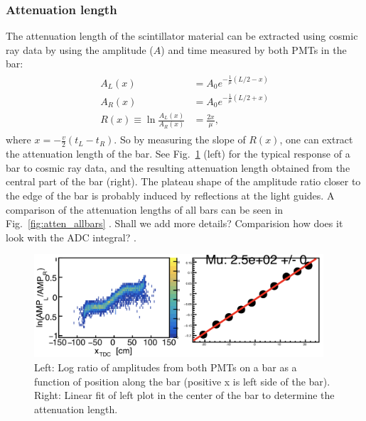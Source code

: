 \documentclass[3p,final,twocolumn]{elsarticle}
\begin{document}
{%
\subsubsection{Attenuation length}
The attenuation length of the scintillator material can be extracted using cosmic ray data by using the 
amplitude ($A$) and time measured by both PMTs in the bar:
\begin{eqnarray}
	\begin{split}
		A_L(x) &= A_0 e^{-\frac{1}{\mu}\left(L/2-x\right) }				\\
		A_R(x) &= A_0 e^{-\frac{1}{\mu}\left(L/2+x\right) }				\\
		R(x) \equiv \ln{\frac{A_L(x)}{A_R(x)}} &= \frac{2x}{\mu},					
		 \label{eqn:atten}
	\end{split}
\end{eqnarray}
where $x=-\frac{v}{2}(t_L - t_R)$. So by measuring the slope of $R(x)$, one can extract the attenuation length 
of the bar. See Fig.~\ref{fig:atten} (left) for the typical response of a bar to cosmic ray data, and the resulting attenuation 
length obtained from the central part of the bar (right). The plateau shape of the amplitude ratio closer to the edge of the bar is probably induced by reflections at the light guides.   
 {\color{red} A comparison of the attenuation lengths of all bars can be seen in Fig.~\ref{fig:atten_allbars} }.
 {\color{red} Shall we add more details?  Comparision how does it look with the ADC integral? }.
\begin{figure}[h!]
	\centering
		\includegraphics[width=0.96\textwidth]{atten.png}
	\caption{Left: Log ratio of amplitudes from both PMTs on a bar as a function of position along the bar (positive x is left side of the bar). Right: Linear fit of left plot in the center of the bar to determine the attenuation length.}
	\label{fig:atten}
\end{figure}

}
\end{document}
